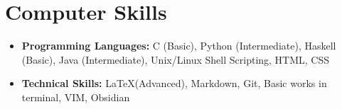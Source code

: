 \documentclass[10pt,a4paper,sans,colorlinks]{moderncv}        %
\begin{document}
\section{Computer Skills}

\begin{itemize}

	\item \textbf{Programming Languages:} C (Basic), Python (Intermediate), Haskell (Basic), Java (Intermediate), Unix/Linux Shell Scripting, HTML, CSS

	\item \textbf{Technical Skills:} \LaTeX (Advanced), Markdown, Git, Basic works in terminal, VIM, Obsidian


\end{itemize}
%
%
%
%
%	


\end{document}
